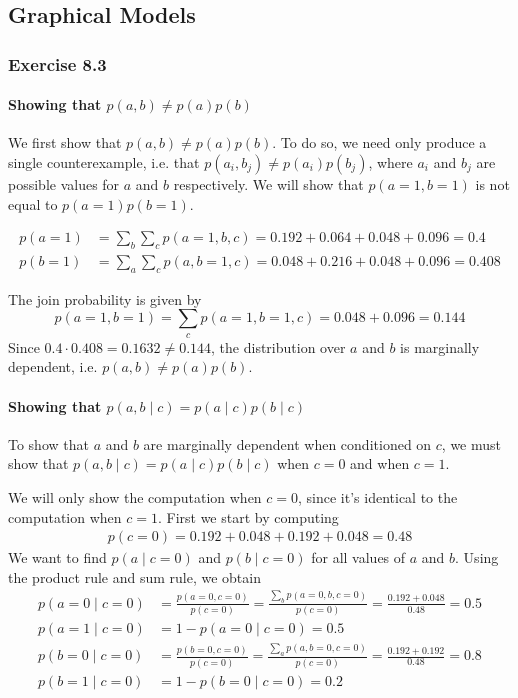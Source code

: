 \documentclass[12pt, a4paper]{article}
\begin{document}
\subsection{Graphical Models}
\subsubsection*{Exercise 8.3}
\paragraph{Showing that $p(a, b) \neq p(a) p(b)$}
We first show that $p(a, b) \neq p(a) p(b)$.
To do so, we need only produce a single counterexample, i.e. that $p(a_i, b_j) \neq p(a_i) p(b_j)$, where $a_i$ and $b_j$ are possible values for $a$ and $b$ respectively. 
We will show that $p(a=1, b=1)$ is not equal to $p(a=1) p(b=1)$.

\begin{align*}
	p(a=1) &= \sum_b \sum_c p(a=1, b, c) = 0.192 + 0.064 + 0.048 + 0.096 = 0.4 \\
	p(b=1) &= \sum_a \sum_c p(a, b=1, c) = 0.048 + 0.216 + 0.048 + 0.096 = 0.408
\end{align*}

The join probability is given by
\begin{equation*}
	p(a=1, b=1) = \sum_c p(a=1, b=1, c)
	= 0.048 + 0.096 = 0.144
\end{equation*}
Since $0.4 \cdot 0.408 =   0.1632 \neq 0.144$, the distribution over $a$ and $b$ is marginally dependent, i.e. $p(a, b) \neq p(a) p(b)$.

\paragraph{Showing that $p(a, b \mid c) = p(a\mid c) p(b\mid c)$}
To show that $a$ and $b$ are marginally dependent when conditioned on $c$, we must show that $p(a, b \mid c) = p(a\mid c) p(b\mid c)$ when $c=0$ and when $c=1$. 

We will only show the computation when $c=0$, since it's identical to the computation when $c=1$.
First we start by computing
\begin{align*}
	p(c=0) = 0.192 + 0.048 + 0.192 + 0.048 = 0.48
\end{align*}
We want to find $p(a \mid c=0)$ and $p(b \mid c=0)$ for all values of $a$ and $b$.
Using the product rule and sum rule, we obtain
\begin{align*}
	p(a=0 \mid c=0) &= \frac{p(a=0, c=0)}{p(c=0)} =
	\frac{\sum_b p(a=0, b, c=0)}{p(c=0)} =
	 \frac{0.192 + 0.048}{0.48} = 0.5  \\
	p(a=1 \mid c=0) &=1 - p(a=0 \mid c=0) = 0.5  \\
	p(b=0 \mid c=0) &= \frac{p(b=0, c=0)}{p(c=0)} =
	\frac{\sum_a p(a, b=0, c=0)}{p(c=0)} =
	\frac{0.192 + 0.192}{0.48} = 0.8  \\
	p(b=1 \mid c=0) &= 1 - p(b=0 \mid c=0) = 0.2
\end{align*}
\end{document}
